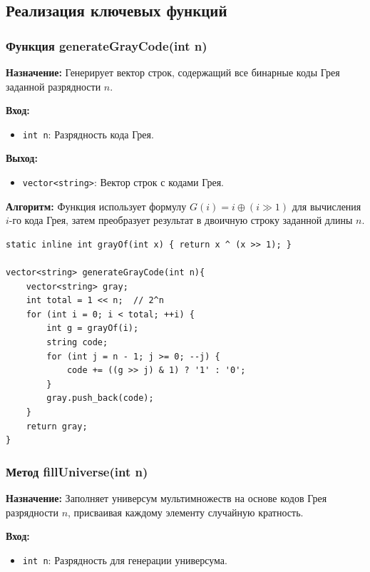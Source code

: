 \subsection{Реализация ключевых функций}

\subsubsection{Функция generateGrayCode(int n)}

\textbf{Назначение:} Генерирует вектор строк, содержащий все бинарные коды Грея заданной разрядности $n$.

\textbf{Вход:}
\begin{itemize}
    \item \texttt{int n}: Разрядность кода Грея.
\end{itemize}

\textbf{Выход:}
\begin{itemize}
    \item \texttt{vector<string>}: Вектор строк с кодами Грея.
\end{itemize}

\textbf{Алгоритм:} Функция использует формулу $G(i) = i \oplus (i \gg 1)$ для вычисления $i$-го кода Грея, затем преобразует результат в двоичную строку заданной длины $n$.

\begin{lstlisting}[style=cstyle, caption={Реализация generateGrayCode()}]
static inline int grayOf(int x) { return x ^ (x >> 1); }

vector<string> generateGrayCode(int n){
    vector<string> gray;
    int total = 1 << n;  // 2^n
    for (int i = 0; i < total; ++i) {
        int g = grayOf(i);
        string code;
        for (int j = n - 1; j >= 0; --j) {
            code += ((g >> j) & 1) ? '1' : '0';
        }
        gray.push_back(code);
    }
    return gray;
}
\end{lstlisting}

\subsubsection{Метод fillUniverse(int n)}

\textbf{Назначение:} Заполняет универсум мультимножеств на основе кодов Грея разрядности $n$, присваивая каждому элементу случайную кратность.

\textbf{Вход:}
\begin{itemize}
    \item \texttt{int n}: Разрядность для генерации универсума.
\end{itemize}


